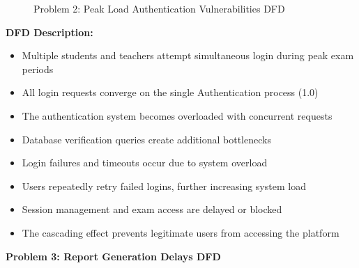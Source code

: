 \documentclass[12pt,a4paper,oneside]{book}
\begin{document}
\begin{figure}[H]
{
    }
    \caption{Problem 2: Peak Load Authentication Vulnerabilities DFD}
\end{figure}

\textbf{DFD Description:} 
\begin{itemize}
    \item Multiple students and teachers attempt simultaneous login during peak exam periods
    \item All login requests converge on the single Authentication process (1.0)
    \item The authentication system becomes overloaded with concurrent requests
    \item Database verification queries create additional bottlenecks
    \item Login failures and timeouts occur due to system overload
    \item Users repeatedly retry failed logins, further increasing system load
    \item Session management and exam access are delayed or blocked
    \item The cascading effect prevents legitimate users from accessing the platform
\end{itemize}

\vspace{0.5cm}
\newpage
\textbf{Problem 3: Report Generation Delays DFD}
\end{document}
